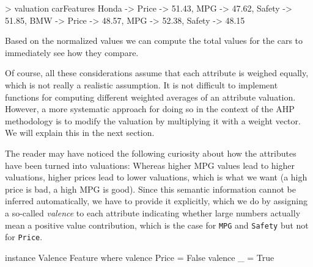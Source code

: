 \documentclass{jfp}
\newcommand{\prog}[1]{\texttt{#1}}
\begin{document}
\begin{haskellcode}
> valuation carFeatures
{Honda -> {Price -> 51.43, MPG -> 47.62, Safety -> 51.85},
 BMW   -> {Price -> 48.57, MPG -> 52.38, Safety -> 48.15}}
\end{haskellcode}

\noindent
%
Based on the normalized values we can compute the total values for the cars to immediately see how they compare.


\noindent
%
Of course, all these considerations assume that each attribute is weighed equally, which is not really a realistic assumption.
%
It is not difficult to implement functions for computing different weighted averages of an attribute valuation. However, a more systematic approach for doing so in the context of the AHP methodology is to modify the valuation by multiplying it with a weight vector.
%
We will explain this in the next section.


\noindent
%
The reader may have noticed the following curiosity about how the attributes have been turned into valuations: Whereas higher MPG values lead to higher valuations, higher prices lead to lower valuations, which is what we want (a high price is bad, a high MPG is good).
%
Since this semantic information cannot be inferred automatically, we have to provide it explicitly, which we do by assigning a so-called \emph{valence} to each attribute indicating whether large numbers actually mean a positive value contribution, which is the case for \prog{MPG} and \prog{Safety} but not for \prog{Price}.

\begin{haskellcode}
instance Valence Feature where
  valence Price = False
  valence _     = True
\end{haskellcode}
\end{document}
